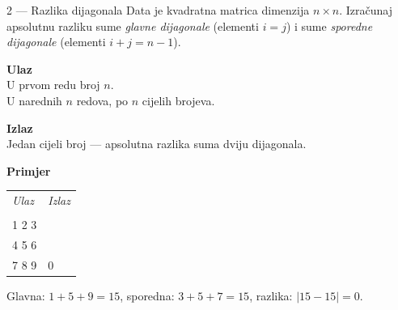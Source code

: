 \documentclass[11pt]{article}
\begin{document}
\begin{zadatak}{2 — Razlika dijagonala}
Data je kvadratna matrica dimenzija $n \times n$.
Izračunaj apsolutnu razliku sume \emph{glavne dijagonale}
(elementi $i = j$) i sume \emph{sporedne dijagonale}
(elementi $i + j = n - 1$).

\medskip
\begin{minipage}[t]{0.45\textwidth}
\textbf{Ulaz}\\[2pt]
U prvom redu broj $n$.\\
U narednih $n$ redova, po $n$ cijelih brojeva.

\medskip
\textbf{Izlaz}\\[2pt]
Jedan cijeli broj — apsolutna razlika suma dviju dijagonala.
\end{minipage}
\hfill
\begin{minipage}[t]{0.48\textwidth}
\textbf{Primjer}\\[2pt]
\begin{tabular}{@{}ll@{}}
\textit{Ulaz} & \textit{Izlaz} \\
\begin{minipage}[t]{2.5cm}
\ttfamily\small
3\\
1 2 3\\
4 5 6\\
7 8 9
\end{minipage}
&
\begin{minipage}[t]{2cm}
\ttfamily\small
0
\end{minipage}
\end{tabular}

\medskip
Glavna: $1{+}5{+}9=15$, sporedna: $3{+}5{+}7=15$, razlika: $|15-15|=0$.
\end{minipage}
\end{zadatak}
\end{document}
